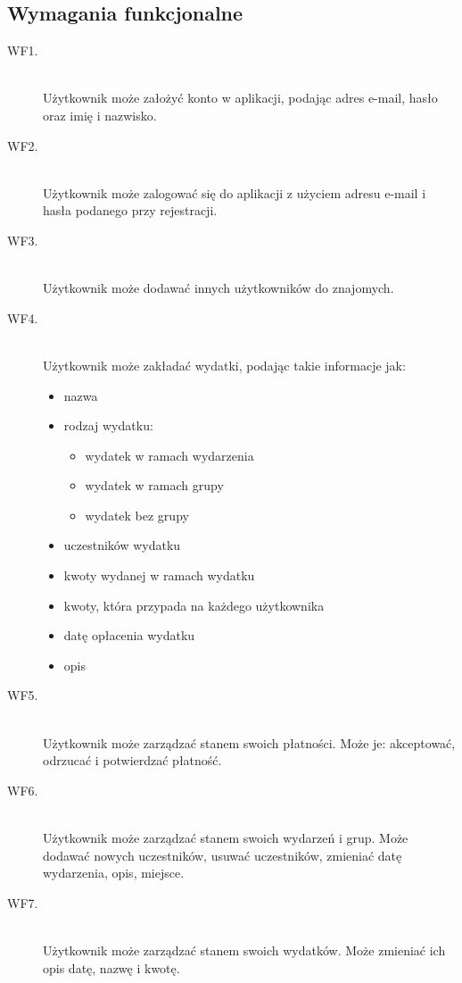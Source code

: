 \subsection{Wymagania funkcjonalne}
\begin{description}
  \item[WF1.] \hfill \\ Użytkownik może założyć konto w aplikacji, podając adres e-mail, hasło oraz imię i nazwisko.
  \item[WF2.] \hfill \\ Użytkownik może zalogować się do aplikacji z użyciem adresu e-mail i hasła podanego przy rejestracji.
  \item[WF3.] \hfill \\ Użytkownik może dodawać innych użytkowników do znajomych.
  \item[WF4.] \hfill \\ Użytkownik może zakładać wydatki, podając takie informacje jak:
    \begin{itemize}
      \item nazwa
      \item rodzaj wydatku:
        \begin{itemize}
          \item wydatek w ramach wydarzenia
          \item wydatek w ramach grupy
          \item wydatek bez grupy
        \end{itemize}
      \item uczestników wydatku
      \item kwoty wydanej w ramach wydatku
      \item kwoty, która przypada na każdego użytkownika
      \item datę opłacenia wydatku
      \item opis
    \end{itemize}
  \item[WF5.] \hfill \\ Użytkownik może zarządzać stanem swoich płatności. Może je: akceptować, odrzucać i potwierdzać płatność.
  \item[WF6.] \hfill \\ Użytkownik może zarządzać stanem swoich wydarzeń i grup. Może dodawać nowych uczestników, usuwać uczestników, zmieniać datę wydarzenia, opis, miejsce.
  \item[WF7.] \hfill \\ Użytkownik może zarządzać stanem swoich wydatków. Może zmieniać ich opis datę, nazwę i kwotę.

\end{description}
